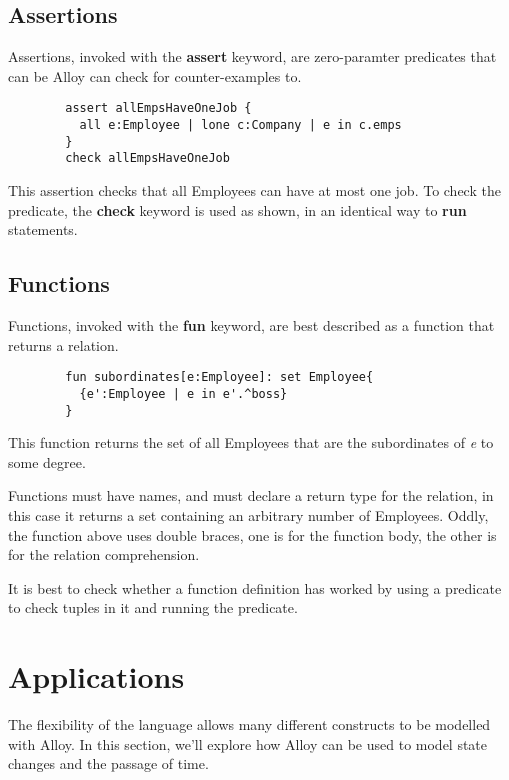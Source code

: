\documentclass[10pt]{article}
\begin{document}
    \subsection*{Assertions}
      Assertions, invoked with the \textbf{assert} keyword, are zero-paramter predicates that can be Alloy can check for counter-examples to.
      \begin{verbatim}
        assert allEmpsHaveOneJob {
          all e:Employee | lone c:Company | e in c.emps
        }
        check allEmpsHaveOneJob
      \end{verbatim}
      This assertion checks that all Employees can have at most one job. To check the predicate, the \textbf{check} keyword is used as shown, in an identical way to \textbf{run} statements.
    \subsection*{Functions}
      Functions, invoked with the \textbf{fun} keyword, are best described as a function that returns a relation.
      \begin{verbatim}
        fun subordinates[e:Employee]: set Employee{
          {e':Employee | e in e'.^boss}
        }
      \end{verbatim}
      This function returns the set of all Employees that are the subordinates of \textit{e} to some degree.\par
      Functions must have names, and must declare a return type for the relation, in this case it returns a set containing an arbitrary number of Employees. Oddly, the function above uses double braces, one is for the function body, the other is for the relation comprehension.\par
      It is best to check whether a function definition has worked by using a predicate to check tuples in it and running the predicate.

  \section*{Applications}
    The flexibility of the language allows many different constructs to be modelled with Alloy. In this section, we'll explore how Alloy can be used to model state changes and the passage of time.
\end{document}
